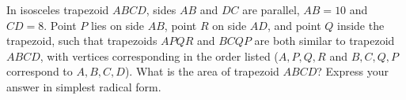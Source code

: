 In isosceles trapezoid $ABCD$, sides $AB$ and $DC$ are parallel, $AB=10$ and $CD=8$. Point $P$ lies on side $AB$, point $R$ on side $AD$, and point $Q$ inside the trapezoid, such that trapezoids $APQR$ and $BCQP$ are both similar to trapezoid $ABCD$, with vertices corresponding in the order listed ($A,P,Q,R$ and $B,C,Q,P$ correspond to $A,B,C,D$). What is the area of trapezoid $ABCD$? Express your answer in simplest radical form.
